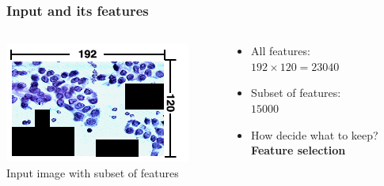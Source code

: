 \documentclass[aspectratio=1610]{beamer}
\begin{document}
\begin{frame}
  \frametitle{\hfill Input and its features}
  \begin{columns}[T]
    \begin{column}{.5\textwidth}
      \begin{block}{}
        \includegraphics[width=\textwidth]{images/FsPicHalvPNG.png}\\
        Input image with subset of features
      \end{block}
    \end{column}
    \begin{column}{.5\textwidth}
      \begin{block}{}
        \begin{itemize}
          \item All features:\\
            $192\times120=23040$
          \item Subset of features:\\
            $15000$\pause
          \item How decide what to keep?\\
          \textbf{Feature selection}
        \end{itemize}
        \vspace{0.02\textheight}
      \end{block}
    \end{column}
  \end{columns}
\end{frame}
\end{document}
